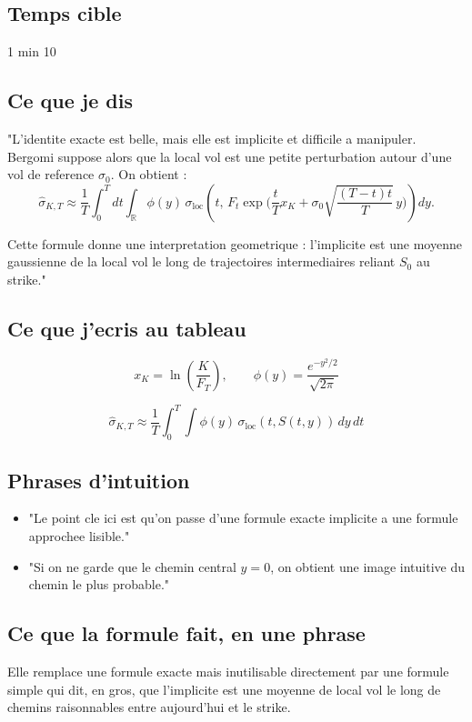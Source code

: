 \documentclass[11pt,a4paper]{article}
\begin{document}
\subsection{Temps cible}
1 min 10

\subsection{Ce que je dis}

"L'identite exacte est belle, mais elle est implicite et difficile a manipuler. Bergomi suppose alors que la local vol est une petite perturbation autour d'une vol de reference \(\sigma_0\). On obtient :
\[
\hat{\sigma}_{K,T}
\approx
\frac{1}{T}
\int_0^T\!\!dt
\int_{\mathbb{R}}\phi(y)\,
\sigma_{\mathrm{loc}}\!\left(
t,\,
F_t\exp\!\Big(
\frac{t}{T}x_K+\sigma_0\sqrt{\frac{(T-t)t}{T}}\,y
\Big)
\right)dy.
\]

Cette formule donne une interpretation geometrique : l'implicite est une moyenne gaussienne de la local vol le long de trajectoires intermediaires reliant \(S_0\) au strike."

\subsection{Ce que j'ecris au tableau}

\[
x_K=\ln\!\left(\frac{K}{F_T}\right),\qquad
\phi(y)=\frac{e^{-y^2/2}}{\sqrt{2\pi}}
\]

\[
\hat{\sigma}_{K,T}\approx \frac1T\int_0^T\!\!\int \phi(y)\,\sigma_{\mathrm{loc}}(t,S(t,y))\,dy\,dt
\]

\subsection{Phrases d'intuition}

\begin{itemize}
\item "Le point cle ici est qu'on passe d'une formule exacte implicite a une formule approchee lisible."
\item "Si on ne garde que le chemin central \(y=0\), on obtient une image intuitive du chemin le plus probable."
\end{itemize}

\subsection{Ce que la formule fait, en une phrase}

Elle remplace une formule exacte mais inutilisable directement par une formule simple qui dit, en gros, que l'implicite est une moyenne de local vol le long de chemins raisonnables entre aujourd'hui et le strike.
\end{document}

